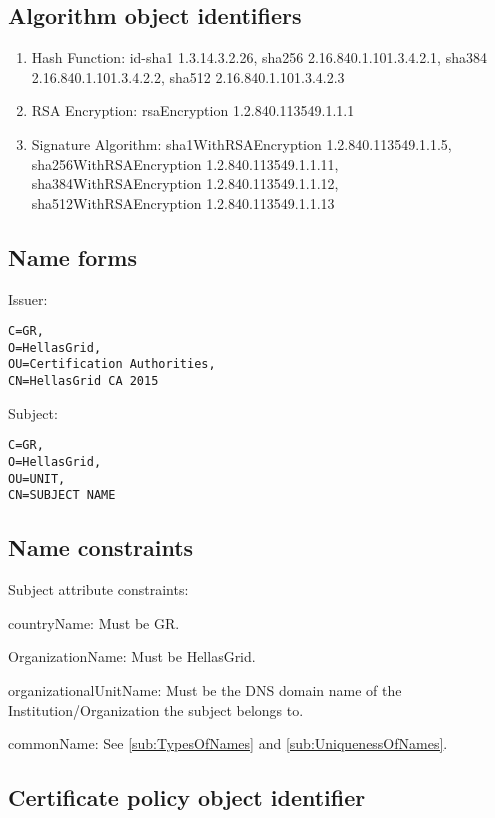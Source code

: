 \subsection{Algorithm object identifiers}

\begin{enumerate}
\item{Hash Function: id-sha1 1.3.14.3.2.26, sha256 2.16.840.1.101.3.4.2.1, sha384 2.16.840.1.101.3.4.2.2, sha512 2.16.840.1.101.3.4.2.3}
\item{RSA Encryption: rsaEncryption 1.2.840.113549.1.1.1}
\item{Signature Algorithm: sha1WithRSAEncryption 1.2.840.113549.1.1.5, sha256WithRSAEncryption 1.2.840.113549.1.1.11, sha384WithRSAEncryption 1.2.840.113549.1.1.12, sha512WithRSAEncryption 1.2.840.113549.1.1.13}
\end{enumerate}

\subsection{Name forms}

Issuer:

\begin{verbatim}
C=GR,
O=HellasGrid,
OU=Certification Authorities,
CN=HellasGrid CA 2015
\end{verbatim}

Subject:

\begin{verbatim}
C=GR,
O=HellasGrid,
OU=UNIT,
CN=SUBJECT NAME
\end{verbatim}

\subsection{Name constraints}

Subject attribute constraints:

countryName:
Must be GR.

OrganizationName:
Must be HellasGrid.

organizationalUnitName:
Must be the DNS domain name of the Institution/Organization the subject belongs to.

commonName:
See \ref{sub:TypesOfNames} and \ref{sub:UniquenessOfNames}.


\subsection{Certificate policy object identifier}

